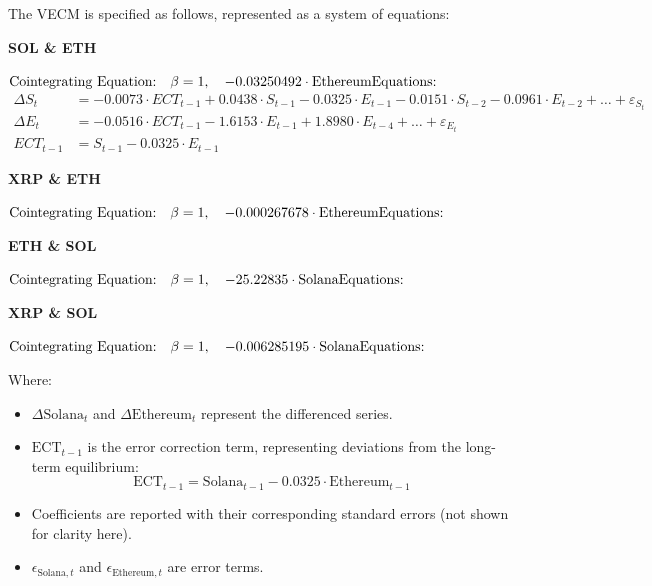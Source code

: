 The VECM is specified as follows, represented as a system of equations:\\

\begin{center}
    \textbf{SOL \& ETH}
\end{center}
$\text{Cointegrating Equation:} \quad  \beta = 1, \quad -0.03250492 \cdot \text{Ethereum} \\
\text{Equations:}$
\begin{align*}
\Delta S_t &= -0.0073 \cdot ECT_{t-1} + 0.0438 \cdot S_{t-1} - 0.0325 \cdot E_{t-1} - 0.0151 \cdot S_{t-2} - 0.0961 \cdot E_{t-2} + \dots + \varepsilon_{S_t} \\
\Delta E_t &= -0.0516 \cdot ECT_{t-1} - 1.6153 \cdot E_{t-1} + 1.8980 \cdot E_{t-4} + \dots + \varepsilon_{E_t} \\
ECT_{t-1} &= S_{t-1} - 0.0325 \cdot E_{t-1}
\end{align*}
%
\begin{center}
    \textbf{XRP \& ETH}
\end{center}
$\text{Cointegrating Equation:} \quad  \beta = 1, \quad -0.000267678 \cdot \text{Ethereum} \\
\text{Equations:} $


%
\begin{center}
   \textbf{ETH \& SOL}
\end{center}
$\text{Cointegrating Equation:} \quad  \beta = 1, \quad -25.22835 \cdot \text{Solana} \\
\text{Equations:} $


%
\begin{center}
    \textbf{XRP \& SOL}
\end{center}
$\text{Cointegrating Equation:} \quad  \beta = 1, \quad -0.006285195 \cdot \text{Solana}\\
\text{Equations:} $


%

Where:
\begin{itemize}
    \item \(\Delta \text{Solana}_t\) and \(\Delta \text{Ethereum}_t\) represent the differenced series.
    \item \(\text{ECT}_{t-1}\) is the error correction term, representing deviations from the long-term equilibrium:
    \[
    \text{ECT}_{t-1} = \text{Solana}_{t-1} - 0.0325 \cdot \text{Ethereum}_{t-1}
    \]
    \item Coefficients are reported with their corresponding standard errors (not shown for clarity here).
    \item \(\epsilon_{\text{Solana}, t}\) and \(\epsilon_{\text{Ethereum}, t}\) are error terms.
\end{itemize}

